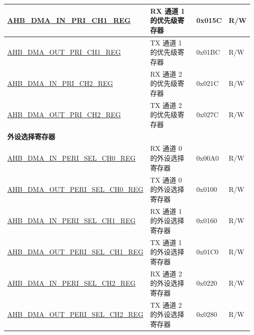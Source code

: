 \begin{longtable}{ | l | l | p{1.3cm} | l | }
\hyperref[regdesc:AHBDMAINPRICHNREG]{AHB\_DMA\_IN\_PRI\_CH1\_REG} & RX 通道 1 的优先级寄存器 & 0x015C & R/W \\ \hline
\hyperref[regdesc:AHBDMAOUTPRICHNREG]{AHB\_DMA\_OUT\_PRI\_CH1\_REG} & TX 通道 1 的优先级寄存器 & 0x01BC & R/W \\ \hline
\hyperref[regdesc:AHBDMAINPRICHNREG]{AHB\_DMA\_IN\_PRI\_CH2\_REG} & RX 通道 2 的优先级寄存器 & 0x021C & R/W \\ \hline
\hyperref[regdesc:AHBDMAOUTPRICHNREG]{AHB\_DMA\_OUT\_PRI\_CH2\_REG} & TX 通道 2 的优先级寄存器 & 0x027C & R/W \\ \hline
\multicolumn{4}{|l|}{\textbf{外设选择寄存器}} \\ \hline
\hyperref[regdesc:AHBDMAINPERISELCHNREG]{AHB\_DMA\_IN\_PERI\_SEL\_CH0\_REG} & RX 通道 0 的外设选择寄存器 & 0x00A0 & R/W \\ \hline
\hyperref[regdesc:AHBDMAOUTPERISELCHNREG]{AHB\_DMA\_OUT\_PERI\_SEL\_CH0\_REG} & TX 通道 0 的外设选择寄存器 & 0x0100 & R/W \\ \hline
\hyperref[regdesc:AHBDMAINPERISELCHNREG]{AHB\_DMA\_IN\_PERI\_SEL\_CH1\_REG} & RX 通道 1 的外设选择寄存器 & 0x0160 & R/W \\ \hline
\hyperref[regdesc:AHBDMAOUTPERISELCHNREG]{AHB\_DMA\_OUT\_PERI\_SEL\_CH1\_REG} & TX 通道 1 的外设选择寄存器 & 0x01C0 & R/W \\ \hline
\hyperref[regdesc:AHBDMAINPERISELCHNREG]{AHB\_DMA\_IN\_PERI\_SEL\_CH2\_REG} & RX 通道 2 的外设选择寄存器 & 0x0220 & R/W \\ \hline
\hyperref[regdesc:AHBDMAOUTPERISELCHNREG]{AHB\_DMA\_OUT\_PERI\_SEL\_CH2\_REG} & TX 通道 2 的外设选择寄存器 & 0x0280 & R/W \\ \hline
\end{longtable}
